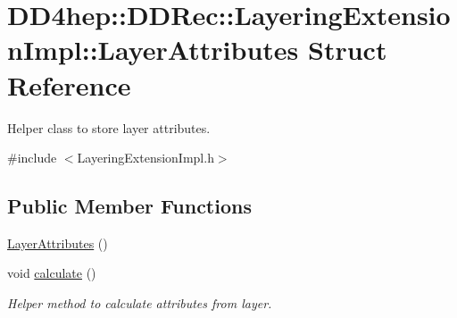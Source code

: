 \hypertarget{struct_d_d4hep_1_1_d_d_rec_1_1_layering_extension_impl_1_1_layer_attributes}{
\section{DD4hep::DDRec::LayeringExtensionImpl::LayerAttributes Struct Reference}
\label{struct_d_d4hep_1_1_d_d_rec_1_1_layering_extension_impl_1_1_layer_attributes}
}


Helper class to store layer attributes.  


{\ttfamily \#include $<$LayeringExtensionImpl.h$>$}\subsection*{Public Member Functions}
\begin{DoxyCompactItemize}
\item 
\hyperlink{struct_d_d4hep_1_1_d_d_rec_1_1_layering_extension_impl_1_1_layer_attributes_a74da79c055a10ae02187e41717de53d6}{LayerAttributes} ()
\item 
void \hyperlink{struct_d_d4hep_1_1_d_d_rec_1_1_layering_extension_impl_1_1_layer_attributes_acb31b89b26048767becea08cccc4d93f}{calculate} ()
\begin{DoxyCompactList}\small\item\em Helper method to calculate attributes from layer. \item\end{DoxyCompactList}\end{DoxyCompactItemize}
